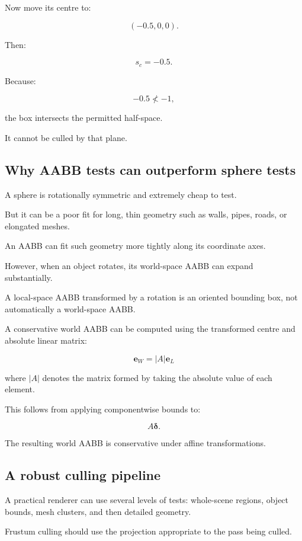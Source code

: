 Now move its centre to:

\[
 (-0.5,0,0).
\]

Then:

\[
 s_c=-0.5.
\]

Because:

\[
 -0.5\not<-1,
\]

the box intersects the permitted half-space.

It cannot be culled by that plane.

\subsection{Why AABB tests can outperform sphere tests}\label{02-foundations-ii-ch034-why-aabb-tests-can-outperform-sphere-tests}

A sphere is rotationally symmetric and extremely cheap to test.

But it can be a poor fit for long, thin geometry such as walls, pipes, roads, or elongated meshes.

An AABB can fit such geometry more tightly along its coordinate axes.

However, when an object rotates, its world-space AABB can expand substantially.

A local-space AABB transformed by a rotation is an oriented bounding box, not automatically a world-space AABB.

A conservative world AABB can be computed using the transformed centre and absolute linear matrix:

\[
 \boxed{ \mathbf e_W=|A|\mathbf e_L }
\]

where \(|A|\) denotes the matrix formed by taking the absolute value of each element.

This follows from applying componentwise bounds to:

\[
 A\boldsymbol\delta.
\]

The resulting world AABB is conservative under affine transformations.

\subsection{A robust culling pipeline}\label{02-foundations-ii-ch034-a-robust-culling-pipeline}

A practical renderer can use several levels of tests: whole-scene regions, object bounds, mesh clusters, and then detailed geometry.

Frustum culling should use the projection appropriate to the pass being culled.

